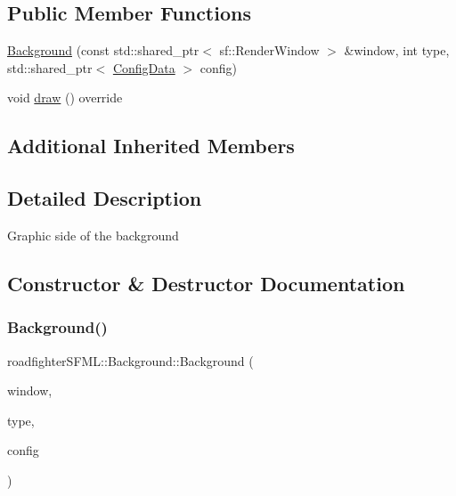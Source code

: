 \subsection*{Public Member Functions}
\begin{DoxyCompactItemize}
\item 
\hyperlink{classroadfighterSFML_1_1Background_ade9e620ebf8ae9a92012a85c356788b1}{Background} (const std\+::shared\+\_\+ptr$<$ sf\+::\+Render\+Window $>$ \&window, int type, std\+::shared\+\_\+ptr$<$ \hyperlink{classConfigData}{Config\+Data} $>$ config)
\item 
void \hyperlink{classroadfighterSFML_1_1Background_a02b49875cfb5d0c77d30c2ddbc05c46f}{draw} () override
\end{DoxyCompactItemize}
\subsection*{Additional Inherited Members}


\subsection{Detailed Description}
Graphic side of the background 

\subsection{Constructor \& Destructor Documentation}
\mbox{\label{classroadfighterSFML_1_1Background_ade9e620ebf8ae9a92012a85c356788b1}} 
\subsubsection{\texorpdfstring{Background()}{Background()}}
{\footnotesize\ttfamily roadfighter\+S\+F\+M\+L\+::\+Background\+::\+Background (\begin{DoxyParamCaption}\item[{const std\+::shared\+\_\+ptr$<$ sf\+::\+Render\+Window $>$ \&}]{window,  }\item[{int}]{type,  }\item[{std\+::shared\+\_\+ptr$<$ \hyperlink{classConfigData}{Config\+Data} $>$}]{config }\end{DoxyParamCaption})}

